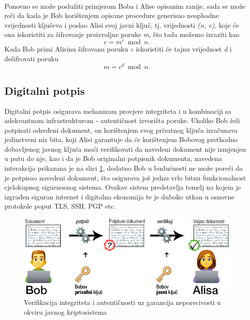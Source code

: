 \paragraph*{}
Ponovno se može poslužiti primjerom Boba i Alise opisanim ranije, sada se može reči da kada je Bob korištenjem opisane procedure generisao neophodne vrijednosti ključeva i poslao Alisi svoj javni ključ, tj. vrijednosti \textit{(n, e)}, koje će ona iskoristiti za šifrovanje proizvoljne poruke \textit{m}, što tada možemo izraziti kao \[c = m^e\bmod n.\] Kada Bob primi Alisinu šifrovanu poruku \textit{c} iskoristiti će tajnu vrijednost \textit{d} i dešifrovati poruku \[m = c^d\bmod n.\]

\subsection{Digitalni potpis}
Digitalni potpis osigurava mehanizam provjere integriteta i u kombinaciji sa adekvantnom infrastrukturom - autentičnost izvorišta poruke. Ukoliko Bob želi potpisati određeni dokument, on korištenjem svog privatnog ključa izračunava jedinstveni niz bita, koji Alisi garantuje da će korištenjem Bobovog prethodno dobavljenog javnog ključa moći verifikovati da navedeni dokument nije izmjenjen u putu do nje, kao i da je Bob originalni potpisnik dokumenta, navedena interakcija prikazana je na slici \ref{fig:alice_bob_sig}, dodatno Bob u budućnosti ne može poreči da je potpisao navedeni dokument, što osigurava još jednu vrlo bitnu funkcionalnost cjelokupnog sigurnosnog sistema. Ovakav sistem predstavlja temelj na kojem je izgrađen siguran internet i digitalna ekonomija te je duboko utkan u osnovne protokole poput TLS, SSH, PGP etc.

\begin{figure}[H]
    \centering
    \includegraphics[width=1.0\textwidth]{material/bob_alice_sig}
    \caption{Verifikacija integriteta i autentičnosti uz garancija neporecivosti u okviru javnog kriptosistema}
    \label{fig:alice_bob_sig}
\end{figure}

